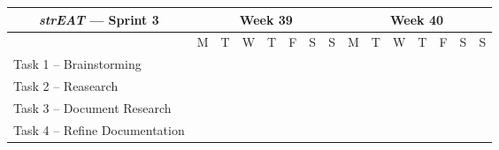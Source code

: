 \begin{table}[h!]
\centering
\begin{tabular}{@{}lllllllllllllll@{}}
\toprule
\multicolumn{1}{c}{\textbf{\textit{strEAT} --- Sprint 3}} & \multicolumn{7}{c}{Week 39}                                                                                                                                                                & \multicolumn{7}{c}{Week 40}                                                                                                                  \\ \midrule
\multicolumn{1}{r}{}                      & M                        & T                        & W                        & T                        & F                        & S                        & S                        & M                        & T                        & W                        & T                        & F                        & S & S \\ \midrule
Task 1 -- Brainstorming                          & \cellcolor[HTML]{C0C0C0} & \cellcolor[HTML]{C0C0C0} & \cellcolor[HTML]{C0C0C0} &                          &                          &                          &                          &                          &                          &                          &                          &                          &   &   \\ \midrule
Task 2 -- Reasearch                              &                          &                          &                          & \cellcolor[HTML]{C0C0C0} & \cellcolor[HTML]{C0C0C0} & \cellcolor[HTML]{C0C0C0} & \cellcolor[HTML]{C0C0C0} &                          &                          &                          &                          &                          &   &   \\ \midrule
Task 3 -- Document Research                      &                          &                          &                          & \cellcolor[HTML]{C0C0C0} & \cellcolor[HTML]{C0C0C0} & \cellcolor[HTML]{C0C0C0} & \cellcolor[HTML]{C0C0C0} &                          &                          &                          &                          &                          &   &   \\ \midrule
Task 4 -- Refine Documentation                   &                          &                          &                          &                          &                          &                          &                          & \cellcolor[HTML]{C0C0C0} &                          &                          &                          &                          &   &   \\ \midrule

\end{tabular}
\end{table}
